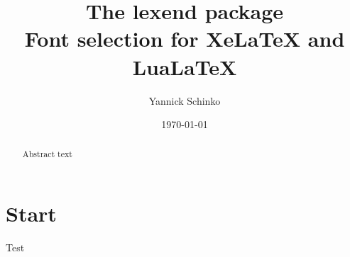 \documentclass[12pt,oneside,a4paper]{memoir}
\begin{document}
\title{
	The \textsf{lexend} package\\
	\small{Font selection for XeLaTeX and LuaLaTeX}
}
\author{
	Yannick Schinko
}
\date{
	\today\\
}

\NoBgThispage
\maketitle

\begin{abstract}
Abstract text
\end{abstract}

\tableofcontents

\newpage
{}

\chapter{Start}

Test
\end{document}
